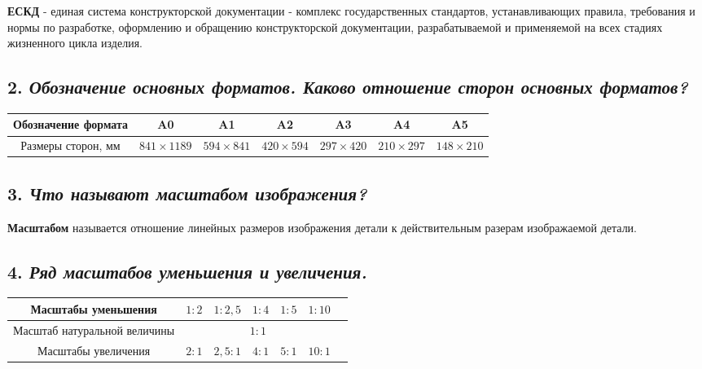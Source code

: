 \textbf{ЕСКД} - единая система конструкторской документации - комплекс государственных стандартов, устанавливающих правила, требования и нормы по разработке, оформлению и обращению конструкторской документации, разрабатываемой и применяемой на всех стадиях жизненного цикла изделия.
\subsection*{2. \textit{Обозначение основных форматов. Каково отношение сторон основных форматов?}}
\begin{center}
\begin{tabular}{|c|c|c|c|c|c|c|}
\hline




Обозначение формата&A0&A1&A2&A3&A4&A5\\ \hline

Размеры сторон, мм &$841\times 1189$&$594\times 841$&$420\times 594$&$297\times 420$&$210\times 297$&$148\times 210$\\ \hline

\hline
\end{tabular}
\end{center}
\subsection*{3. \textit{Что называют масштабом изображения?}}

\textbf{Масштабом} называется отношение линейных размеров изображения детали к действительным разерам изображаемой детали.
\subsection*{4. \textit{Ряд масштабов уменьшения и увеличения.}}
\begin{center}
\begin{tabular}{|c|c|c|c|c|c p{-10pt}|}
\hline




Масштабы уменьшения&$1:2$&$1:2,5$&$1:4$&$1:5$&$1:10$&\\ \hline

Масштаб натуральной величины&\multicolumn{5}{c}{$1:1$}&\\ \hline

Масштабы увеличения&$2:1$&$2,5:1$&$4:1$&$5:1$&$10:1$&\\ \hline

\hline
\end{tabular}
\end{center}
